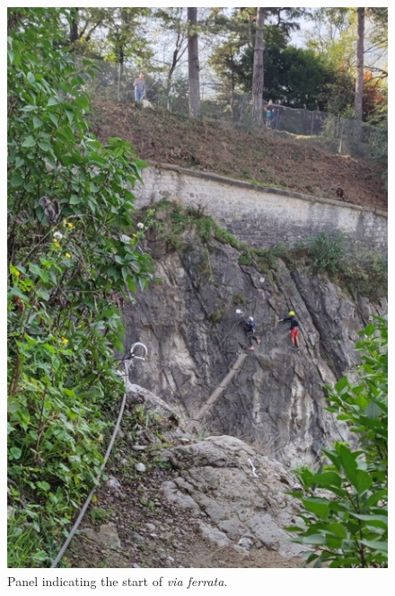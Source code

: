 \begin{figure}[!ht]
	\centering%
	\includegraphics[width=\columnwidth, clip]{media/pictures/via-ferrata-les-prises-de-la-bastille-3}
	\caption{\label{fig:via-ferrata-les-prises-de-la-bastille-3}Panel indicating the start of \emph{via ferrata}.}
\end{figure}

